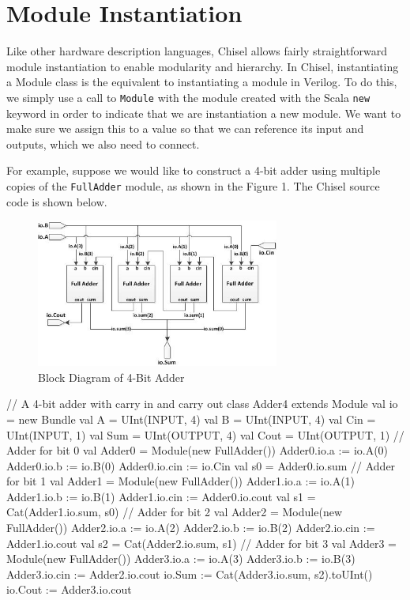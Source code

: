 \section{Module Instantiation}

Like other hardware description languages, Chisel allows fairly straightforward module instantiation to enable modularity and hierarchy. In Chisel, instantiating a Module class is the equivalent to instantiating a module in Verilog. To do this, we simply use a call to \verb+Module+ with the module created with the Scala \verb+new+ keyword in order to indicate that we are instantiation a new module. We want to make sure we assign this to a value so that we can reference its input and outputs, which we also need to connect.

For example, suppose we would like to construct a 4-bit adder using multiple copies of the  \verb+FullAdder+ module, as shown in the Figure 1. The Chisel source code is shown below.

\begin{figure}[ht!]
\centering
\includegraphics[width=80mm]{figs/4_Bit_Adder.jpg}
\caption{Block Diagram of 4-Bit Adder}
\label{overflow}
\end{figure}

\begin{scala}
// A 4-bit adder with carry in and carry out
class Adder4 extends Module {
  val io = new Bundle {
    val A    = UInt(INPUT, 4)
    val B    = UInt(INPUT, 4)
    val Cin  = UInt(INPUT, 1)
    val Sum  = UInt(OUTPUT, 4)
    val Cout = UInt(OUTPUT, 1)
  }
  // Adder for bit 0
  val Adder0 = Module(new FullAdder())
  Adder0.io.a   := io.A(0)
  Adder0.io.b   := io.B(0)
  Adder0.io.cin := io.Cin
  val s0 = Adder0.io.sum
  // Adder for bit 1
  val Adder1 = Module(new FullAdder())
  Adder1.io.a   := io.A(1)
  Adder1.io.b   := io.B(1)
  Adder1.io.cin := Adder0.io.cout
  val s1 = Cat(Adder1.io.sum, s0)
  // Adder for bit 2
  val Adder2 = Module(new FullAdder())
  Adder2.io.a   := io.A(2)
  Adder2.io.b   := io.B(2)
  Adder2.io.cin := Adder1.io.cout
  val s2 = Cat(Adder2.io.sum, s1)
  // Adder for bit 3
  val Adder3 = Module(new FullAdder())
  Adder3.io.a   := io.A(3)
  Adder3.io.b   := io.B(3)
  Adder3.io.cin := Adder2.io.cout
  io.Sum  := Cat(Adder3.io.sum, s2).toUInt()
  io.Cout := Adder3.io.cout
}
\end{scala}

